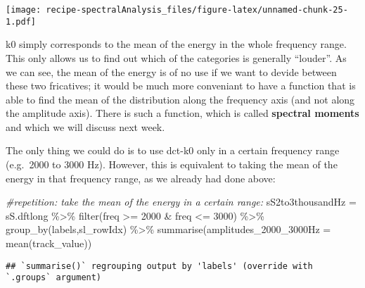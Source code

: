\documentclass[
]{book}
\newenvironment{Shaded}{\begin{snugshade}}{\end{snugshade}}
\newcommand{\AttributeTok}[1]{\textcolor[rgb]{0.77,0.63,0.00}{#1}}
\newcommand{\CommentTok}[1]{\textcolor[rgb]{0.56,0.35,0.01}{\textit{#1}}}
\newcommand{\DecValTok}[1]{\textcolor[rgb]{0.00,0.00,0.81}{#1}}
\newcommand{\FunctionTok}[1]{\textcolor[rgb]{0.00,0.00,0.00}{#1}}
\newcommand{\NormalTok}[1]{#1}
\newcommand{\OtherTok}[1]{\textcolor[rgb]{0.56,0.35,0.01}{#1}}
\newcommand{\SpecialCharTok}[1]{\textcolor[rgb]{0.00,0.00,0.00}{#1}}
\begin{document}
\texttt{[image: recipe-spectralAnalysis\_files/figure-latex/unnamed-chunk-25-1.pdf]}

k0 simply corresponds to the mean of the energy in the whole frequency range. This only allows us to find out which of the categories is generally ``louder''. As we can see, the mean of the energy is of no use if we want to devide between these two fricatives; it would be much more conveniant to have a function that is able to find the mean of the distribution along the frequency axis (and not along the amplitude axis). There is such a function, which is called \textbf{spectral moments} and which we will discuss next week.

The only thing we could do is to use dct-k0 only in a certain frequency range (e.g.~2000 to 3000 Hz). However, this is equivalent to taking the mean of the energy in that frequency range, as we already had done above:

\begin{Shaded}
\begin{Highlighting}[]
\CommentTok{\#repetition: take the mean of the energy in a certain range:}
\NormalTok{sS2to3thousandHz }\OtherTok{=}\NormalTok{ sS.dftlong }\SpecialCharTok{\%\textgreater{}\%}
  \FunctionTok{filter}\NormalTok{(freq }\SpecialCharTok{\textgreater{}=} \DecValTok{2000} \SpecialCharTok{\&}\NormalTok{ freq }\SpecialCharTok{\textless{}=} \DecValTok{3000}\NormalTok{) }\SpecialCharTok{\%\textgreater{}\%}
  \FunctionTok{group\_by}\NormalTok{(labels,sl\_rowIdx) }\SpecialCharTok{\%\textgreater{}\%}
  \FunctionTok{summarise}\NormalTok{(}\AttributeTok{amplitudes\_2000\_3000Hz =} \FunctionTok{mean}\NormalTok{(track\_value))}
\end{Highlighting}
\end{Shaded}

\begin{verbatim}
## `summarise()` regrouping output by 'labels' (override with `.groups` argument)
\end{verbatim}
\end{document}
